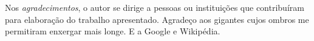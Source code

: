 Nos \emph{agradecimentos}, o autor se dirige a pessoas ou instituições que 
contribuíram para elaboração do trabalho apresentado. Agradeço aos gigantes cujos
ombros me permitiram enxergar mais longe. E a Google e Wikipédia.